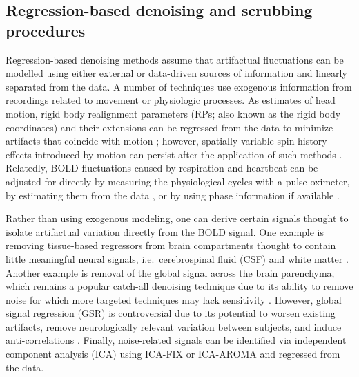 \documentclass{article}
\begin{document}
\subsection{Regression-based denoising and scrubbing procedures}

Regression-based denoising methods assume that artifactual fluctuations can be modelled using either external or data-driven sources of information and linearly separated from the data. A number of techniques use exogenous information from recordings related to movement or physiologic processes. As estimates of head motion, rigid body realignment parameters (RPs; also known as the rigid body coordinates) and their extensions can be regressed from the data to minimize artifacts that coincide with motion \citep{powerSpuriousSystematicCorrelations2012,vandijkInfluenceHeadMotion2012,satterthwaiteImpactInScannerHead2012,yanComprehensiveAssessmentRegional2013}; however, spatially variable spin-history effects introduced by motion can persist after the application of such methods \citep{Yancey2011Spin-historyCorrection}. Relatedly, BOLD fluctuations caused by respiration and heartbeat can be adjusted for directly by measuring the physiological cycles with a pulse oximeter, by estimating them from the data %
\citep{leRetrospectiveEstimationCorrection1996, powerSourcesImplicationsWholebrain2017, agrawalModelbasedPhysiologicalNoise2020, salas2021reconstruction}, or by using phase information if available \citep{cheng2010respiratory}.

Rather than using exogenous modeling, one can derive certain signals thought to isolate artifactual variation directly from the BOLD signal. One example is removing tissue-based regressors from brain compartments thought to contain little meaningful neural signals, i.e.\ cerebrospinal fluid (CSF) and white matter \citep{behzadiComponentBasedNoise2007, muschelliReductionMotionrelatedArtifacts2014, caballero-gaudesMethodsCleaningBOLD2017,satterthwaiteMotionArtifactStudies2019}. Another example is removal of the global signal across the brain parenchyma, which remains a popular catch-all denoising technique due to its ability to remove noise for which more targeted techniques may lack sensitivity \citep{powerMethodsDetectCharacterize2014,ciricBenchmarkingParticipantlevelConfound2017,parkesEvaluationEfficacyReliability2018,satterthwaiteMotionArtifactStudies2019}. However, global signal regression (GSR) is controversial due to its potential to worsen existing artifacts, remove neurologically relevant variation between subjects, and induce anti-correlations \citep{liuGlobalSignalFMRI2017,powerSourcesImplicationsWholebrain2017,caballero-gaudesMethodsCleaningBOLD2017,parkesEvaluationEfficacyReliability2018}. Finally, noise-related signals can be identified via independent component analysis (ICA) using ICA-FIX \citep{salimi-khorshidiAutomaticDenoisingFunctional2014} or ICA-AROMA \citep{pruimICAAROMARobustICAbased2015} and regressed from the data.  
\end{document}
